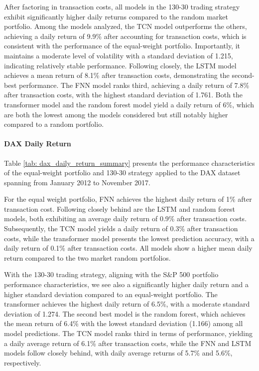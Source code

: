 \documentclass{article}
\begin{document}
After factoring in transaction costs, all models in the 130-30 trading strategy exhibit significantly higher daily returns compared to the random market portfolio. Among the models analyzed, the TCN model outperforms the others, achieving a daily return of 9.9\% after accounting for transaction costs, which is consistent with the performance of the equal-weight portfolio. Importantly, it maintains a moderate level of volatility with a standard deviation of 1.215, indicating relatively stable performance. Following closely, the LSTM model achieves a mean return of 8.1\% after transaction costs, demonstrating the second-best performance. The FNN model ranks third, achieving a daily return of 7.8\% after transaction costs, with the highest standard deviation of 1.761. Both the transformer model and the random forest model yield a daily return of 6\%, which are both the lowest among the models considered but still notably higher compared to a random portfolio.

\paragraph{DAX Daily Return}
Table \ref{tab: dax_daily_return_summary} presents the performance characteristics of the equal-weight portfolio and 130-30 strategy applied to the DAX dataset spanning from January 2012 to November 2017. 

For the equal weight portfolio, FNN achieves the highest daily return of 1\% after transaction cost. Following closely behind are the LSTM and random forest models, both exhibiting an average daily return of 0.9\% after transaction costs. Subsequently, the TCN model yields a daily return of 0.3\% after transaction costs, while the transformer model presents the lowest prediction accuracy, with a daily return of 0.1\% after transaction costs. All models show a higher mean daily return compared to the two market random portfolios.

With the 130-30 trading strategy, aligning with the S\&P 500 portfolio performance characteristics, we see also a significantly higher daily return and a higher standard deviation compared to an equal-weight portfolio. The transformer achieves the highest daily return of 6.5\%, with a moderate standard deviation of 1.274. The second best model is the random forest, which achieves the mean return of 6.4\% with the lowest standard deviation (1.166) among all model predictions. The TCN model ranks third in terms of performance, yielding a daily average return of 6.1\% after transaction costs, while the FNN and LSTM models follow closely behind, with daily average returns of 5.7\% and 5.6\%, respectively.
\end{document}
